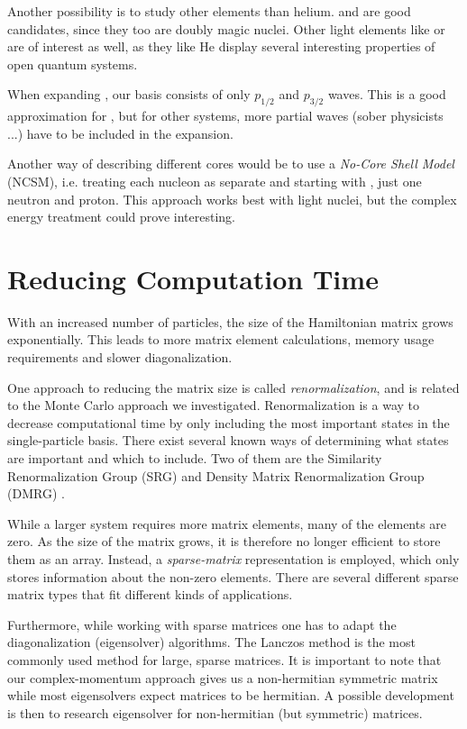 \documentclass[../main/report.tex]{subfiles}
\begin{document}
Another possibility is to study other elements than helium.  and  are good candidates, since they too are doubly magic nuclei.
Other light elements like  or  are of interest as well, as they like He display several interesting properties of open quantum systems.

When expanding , our basis consists of only $p_{1/2}$ and $p_{3/2}$ waves. 
This is a good approximation for  \cite{gamow_shell_model_2008},  but for other systems, more partial waves (sober physicists ...) have to be included in the expansion.

Another way of describing different cores would be to use a \emph{No-Core Shell Model} (NCSM), i.e. treating each nucleon as separate and starting with , just one neutron and proton. This approach works best with light nuclei, but the complex energy treatment could prove interesting.

\section{Reducing Computation Time}

With an increased number of particles, the size of the Hamiltonian matrix grows exponentially. This leads to more matrix element calculations, memory usage requirements and slower diagonalization.

One approach to reducing the matrix size is called \emph{renormalization}, and is related to the Monte Carlo approach we investigated. 
Renormalization is a way to decrease computational time by only including the most important states in the single-particle basis.
There exist several known ways of determining what states are important and which to include. Two of them are the Similarity Renormalization Group (SRG) and Density Matrix Renormalization Group (DMRG) \cite{DMRG}. 

While a larger system requires more matrix elements, many of the elements are zero. 
As the size of the matrix grows, it is therefore no longer efficient to store them as an array. 
Instead, a \emph{sparse-matrix} representation is employed, which only stores information about the non-zero elements. 
There are several different sparse matrix types that fit different kinds of applications. 

Furthermore, while working with sparse matrices one has to adapt the diagonalization (eigensolver) algorithms. 
The Lanczos method is the most commonly used method for large, sparse matrices.
It is important to note that our complex-momentum approach gives us a non-hermitian symmetric matrix while most eigensolvers expect matrices to be hermitian. A possible development is then to research eigensolver for non-hermitian (but symmetric) matrices.
\end{document}
